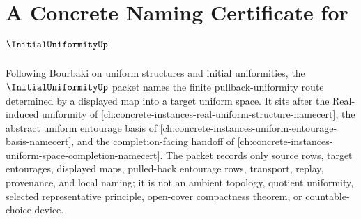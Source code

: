 \chapter{A Concrete Naming Certificate for $\InitialUniformityUp$}
\label{ch:concrete-instances-initial-uniformity-namecert}

Following Bourbaki on uniform structures and initial uniformities, the $\InitialUniformityUp$ packet names the finite pullback-uniformity route determined by a displayed map into a target uniform space. It sits after the Real-induced uniformity of \autoref{ch:concrete-instances-real-uniform-structure-namecert}, the abstract uniform entourage basis of \autoref{ch:concrete-instances-uniform-entourage-basis-namecert}, and the completion-facing handoff of \autoref{ch:concrete-instances-uniform-space-completion-namecert}. The packet records only source rows, target entourages, displayed maps, pulled-back entourage rows, transport, replay, provenance, and local naming; it is not an ambient topology, quotient uniformity, selected representative principle, open-cover compactness theorem, or countable-choice device.

